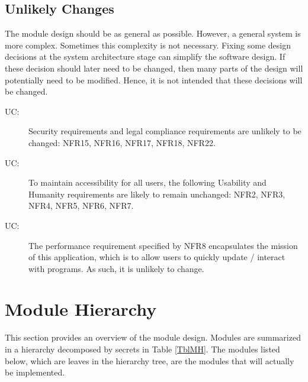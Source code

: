 \documentclass[12pt, titlepage]{article}
\newcounter{ucnum}
\newcommand{\uctheucnum}{UC\theucnum}
\begin{document}
\subsection{Unlikely Changes} \label{SecUchange}

The module design should be as general as possible. However, a general system is
more complex. Sometimes this complexity is not necessary. Fixing some design
decisions at the system architecture stage can simplify the software design. If
these decision should later need to be changed, then many parts of the design
will potentially need to be modified. Hence, it is not intended that these
decisions will be changed.

\begin{description}
\item[ \uctheucnum :] Security requirements and legal compliance requirements are unlikely to be changed: NFR15, NFR16, NFR17, NFR18, NFR22.
\item[ \uctheucnum :] To maintain accessibility for all users, the following Usability and Humanity requirements are likely to remain unchanged: NFR2, NFR3, NFR4, NFR5, NFR6, NFR7.
\item[ \uctheucnum :] The performance requirement specified by NFR8 encapsulates the mission of this application, which is to allow users to quickly update / interact with programs. As such, it is unlikely to change.
\end{description}

\section{Module Hierarchy} \label{SecMH}

This section provides an overview of the module design. Modules are summarized
in a hierarchy decomposed by secrets in Table \ref{TblMH}. The modules listed
below, which are leaves in the hierarchy tree, are the modules that will
actually be implemented.
\end{document}
